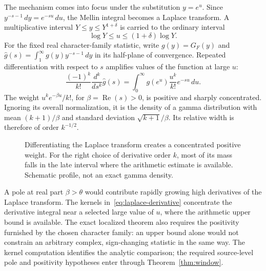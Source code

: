 \documentclass[11pt,openany,oneside]{scrbook}
\theoremstyle{definition}
\theoremstyle{remark}
\newcommand{\Rea}{\operatorname{Re}}
\begin{document}
The mechanism comes into focus under the substitution $y=e^u$. Since $y^{-s-1}\,dy=e^{-su}\,du$, the Mellin integral becomes a Laplace transform. A multiplicative interval $Y\le y\le Y^{1+\delta}$ is carried to the ordinary interval
\[
\log Y\le u\le(1+\delta)\log Y.
\]
For the fixed real character-family statistic, write $g(y)=G_F(y)$ and $\widehat g(s)=\int_1^\infty g(y)y^{-s-1}\,dy$ in its half-plane of convergence. Repeated differentiation with respect to $s$ amplifies values of the function at large $u$:
\begin{equation}\label{eq:laplace-derivative}
\frac{(-1)^k}{k!}\frac{d^k}{ds^k}\widehat g(s)
=\int_0^\infty g(e^u)\frac{u^k}{k!}e^{-su}\,du.
\end{equation}
The weight $u^ke^{-\beta u}/k!$, for $\beta=\Rea(s)>0$, is positive and sharply concentrated. Ignoring its overall normalization, it is the density of a gamma distribution with mean $(k+1)/\beta$ and standard deviation $\sqrt{k+1}/\beta$. Its relative width is therefore of order $k^{-1/2}$.

\begin{figure}[ht]
\centering
{}
\caption{Differentiating the Laplace transform creates a concentrated positive weight. For the right choice of derivative order $k$, most of its mass falls in the late interval where the arithmetic estimate is available. Schematic profile, not an exact gamma density.}
\label{fig:laplace-window}
\end{figure}

A pole at real part $\beta>\theta$ would contribute rapidly growing high derivatives of the Laplace transform. The kernels in~\eqref{eq:laplace-derivative} concentrate the derivative integral near a selected large value of $u$, where the arithmetic upper bound is available. The exact localized theorem also requires the positivity furnished by the chosen character family: an upper bound alone would not constrain an arbitrary complex, sign-changing statistic in the same way. The kernel computation identifies the analytic comparison; the required source-level pole and positivity hypotheses enter through Theorem~\ref{thm:window}.
\end{document}
